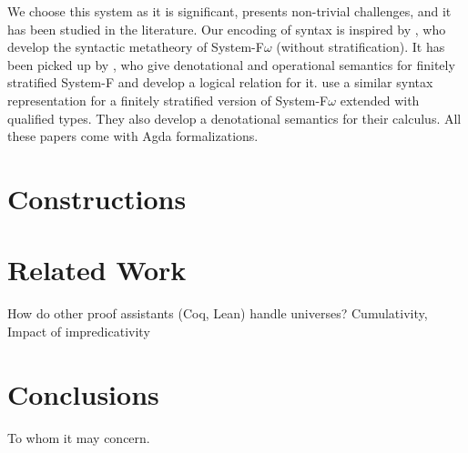 \documentclass[manuscript,screen,review,anonymous]{acmart}
\begin{document}
We choose this system as it is significant, presents non-trivial
challenges, and it has been studied in the literature. Our encoding of
syntax is inspired by \citet{DBLP:conf/mpc/ChapmanKNW19}, who develop
the syntactic metatheory of System-F$\omega$ (without
stratification). It has been  picked up by
\citet{DBLP:conf/tyde/Saffrich0W24}, who give denotational and operational semantics
for finitely stratified System-F and develop a logical relation for
it. \citet{DBLP:journals/pacmpl/HubersM23} use a similar syntax
representation for a finitely stratified version of System-F$\omega$
extended with qualified types. They also develop a denotational
semantics for their calculus. All these papers come with Agda
formalizations. 

\section{Constructions}
\label{sec:constructions}




\section{Related Work}
\label{sec:related-work}

How do other proof assistants (Coq, Lean) handle universes?
Cumulativity, Impact of impredicativity


\section{Conclusions}
\label{sec:conclusions}


\begin{acks}
  To whom it may concern.
\end{acks}



\end{document}
